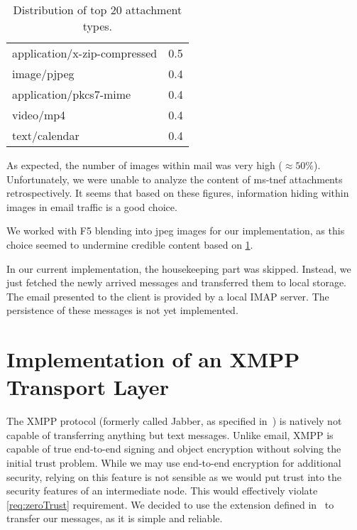 \begin{table}[ht]
\begin{tabular}{l|r}
		application/x-zip-compressed                                                &    0.5\\
		image/pjpeg                                                                 &    0.4\\
		application/pkcs7-mime                                                      &    0.4\\
		video/mp4                                                                   &    0.4\\
		text/calendar                                                               &    0.4\\\hline
	\end{tabular}
	\caption{Distribution of top 20 attachment types.}
	\label{tab:emailAttachments}
\end{table}

As expected, the number of images within mail was very high ($\approx 50\%$). Unfortunately, we were unable to analyze the content of ms-tnef attachments retrospectively. It seems that based on these figures, information hiding within images in email traffic is a good choice.

We worked with F5 blending into jpeg images for our implementation, as this choice seemed to undermine credible content based on \cref{tab:emailAttachments}.

In our current implementation, the housekeeping part was skipped. Instead, we just fetched the newly arrived messages and transferred them to local storage. The email presented to the client is provided by a local IMAP server. The persistence of these messages is not yet implemented. 

\section{Implementation of an XMPP Transport Layer}
The XMPP protocol (formerly called  Jabber, as specified in~\cite{rfc6120}) is natively not capable of transferring anything but text messages. Unlike email, XMPP is capable of true end-to-end signing and object encryption without solving the initial trust problem. While we may use end-to-end encryption for additional security, relying on this feature is not sensible as we would put trust into the security features of an intermediate node. This would effectively violate \ref{req:zeroTrust} requirement. We decided to use the extension defined in~\cite{xep0231} to transfer our messages, as it is simple and reliable.

